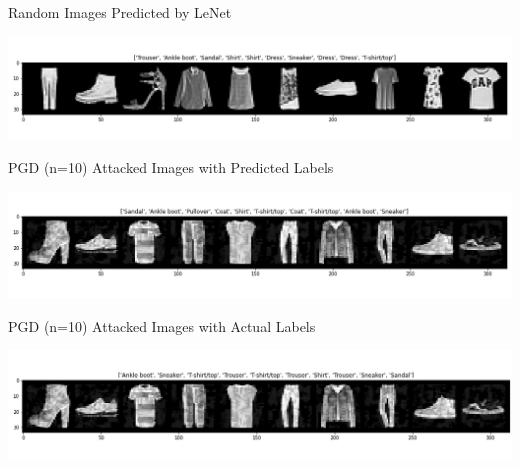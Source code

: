 \documentclass[
	12pt, %
]{fphw}
\begin{document}
\begin{center}
	\caption{Random Images Predicted by LeNet}
	\includegraphics[width=0.95\columnwidth]{Plotclean_new.png} 
	\caption{PGD (n=10) Attacked Images with Predicted Labels}
	\includegraphics[width=0.95\columnwidth]{Plotadv_new_pred.png}
	\caption{PGD (n=10) Attacked Images with Actual Labels}
	\includegraphics[width=0.95\columnwidth]{Plot_new_truelabel.png} 
\end{center}
\end{document}
